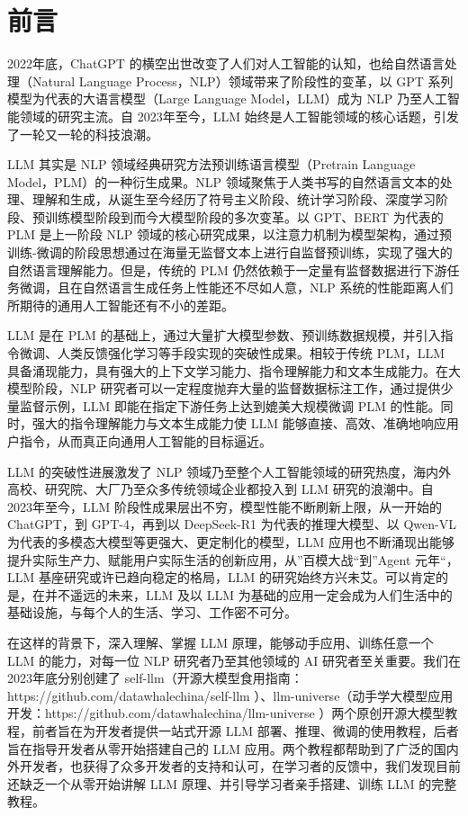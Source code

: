 \documentclass[
]{article}
\author{}
\date{}
\begin{document}
{
\setcounter{tocdepth}{3}
\tableofcontents
}
\section{前言}\label{ux524dux8a00}

2022年底，ChatGPT
的横空出世改变了人们对人工智能的认知，也给自然语言处理（Natural Language
Process，NLP）领域带来了阶段性的变革，以 GPT
系列模型为代表的大语言模型（Large Language Model，LLM）成为 NLP
乃至人工智能领域的研究主流。自 2023年至今，LLM
始终是人工智能领域的核心话题，引发了一轮又一轮的科技浪潮。

LLM 其实是 NLP 领域经典研究方法预训练语言模型（Pretrain Language
Model，PLM）的一种衍生成果。NLP
领域聚焦于人类书写的自然语言文本的处理、理解和生成，从诞生至今经历了符号主义阶段、统计学习阶段、深度学习阶段、预训练模型阶段到而今大模型阶段的多次变革。以
GPT、BERT 为代表的 PLM 是上一阶段 NLP
领域的核心研究成果，以注意力机制为模型架构，通过预训练-微调的阶段思想通过在海量无监督文本上进行自监督预训练，实现了强大的自然语言理解能力。但是，传统的
PLM
仍然依赖于一定量有监督数据进行下游任务微调，且在自然语言生成任务上性能还不尽如人意，NLP
系统的性能距离人们所期待的通用人工智能还有不小的差距。

LLM 是在 PLM
的基础上，通过大量扩大模型参数、预训练数据规模，并引入指令微调、人类反馈强化学习等手段实现的突破性成果。相较于传统
PLM，LLM
具备涌现能力，具有强大的上下文学习能力、指令理解能力和文本生成能力。在大模型阶段，NLP
研究者可以一定程度抛弃大量的监督数据标注工作，通过提供少量监督示例，LLM
即能在指定下游任务上达到媲美大规模微调 PLM
的性能。同时，强大的指令理解能力与文本生成能力使 LLM
能够直接、高效、准确地响应用户指令，从而真正向通用人工智能的目标逼近。

LLM 的突破性进展激发了 NLP
领域乃至整个人工智能领域的研究热度，海内外高校、研究院、大厂乃至众多传统领域企业都投入到
LLM 研究的浪潮中。自 2023年至今，LLM
阶段性成果层出不穷，模型性能不断刷新上限，从一开始的 ChatGPT，到
GPT-4，再到以 DeepSeek-R1 为代表的推理大模型、以 Qwen-VL
为代表的多模态大模型等更强大、更定制化的模型，LLM
应用也不断涌现出能够提升实际生产力、赋能用户实际生活的创新应用，从''百模大战``到''Agent
元年``，LLM 基座研究或许已趋向稳定的格局，LLM
的研究始终方兴未艾。可以肯定的是，在并不遥远的未来，LLM 及以 LLM
为基础的应用一定会成为人们生活中的基础设施，与每个人的生活、学习、工作密不可分。

在这样的背景下，深入理解、掌握 LLM 原理，能够动手应用、训练任意一个 LLM
的能力，对每一位 NLP 研究者乃至其他领域的 AI 研究者至关重要。我们在
2023年底分别创建了
self-llm（开源大模型食用指南：https://github.com/datawhalechina/self-llm
）、llm-universe（动手学大模型应用开发：https://github.com/datawhalechina/llm-universe
）两个原创开源大模型教程，前者旨在为开发者提供一站式开源 LLM
部署、推理、微调的使用教程，后者旨在指导开发者从零开始搭建自己的 LLM
应用。两个教程都帮助到了广泛的国内外开发者，也获得了众多开发者的支持和认可，在学习者的反馈中，我们发现目前还缺乏一个从零开始讲解
LLM 原理、并引导学习者亲手搭建、训练 LLM 的完整教程。
\end{document}
